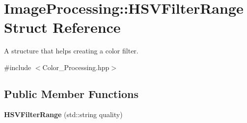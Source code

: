 \hypertarget{struct_image_processing_1_1_h_s_v_filter_range}{}\section{Image\+Processing\+:\+:H\+S\+V\+Filter\+Range Struct Reference}
\label{struct_image_processing_1_1_h_s_v_filter_range}


A structure that helps creating a color filter.  




{\ttfamily \#include $<$Color\+\_\+\+Processing.\+hpp$>$}

\subsection*{Public Member Functions}
\begin{DoxyCompactItemize}
\item 
\mbox{\label{struct_image_processing_1_1_h_s_v_filter_range_a18e8316b637cccf1ad274e7d24bd30ff}} 
{\bfseries H\+S\+V\+Filter\+Range} (std\+::string quality)
\end{DoxyCompactItemize}
